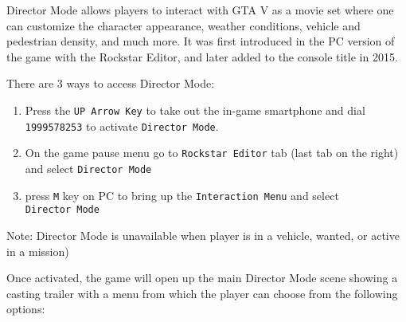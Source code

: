 \documentclass[
  openany]{book}
\providecommand{\tightlist}{%
  \setlength{\itemsep}{0pt}\setlength{\parskip}{0pt}}
\begin{document}
Director Mode allows players to interact with GTA V as a movie set where one can customize the character appearance, weather conditions, vehicle and pedestrian density, and much more.
It was first introduced in the PC version of the game with the Rockstar Editor, and later added to the console title in 2015.

There are 3 ways to access Director Mode:

\begin{enumerate}
\def\labelenumi{\arabic{enumi}.}
\tightlist
\item
  Press the \texttt{UP\ Arrow\ Key} to take out the in-game smartphone and dial \texttt{1999578253} to activate \texttt{Director\ Mode}.
\item
  On the game pause menu go to \texttt{Rockstar\ Editor} tab (last tab on the right) and select \texttt{Director\ Mode}
\item
  press \texttt{M} key on PC to bring up the \texttt{Interaction\ Menu} and select \texttt{Director\ Mode}
\end{enumerate}

Note: Director Mode is unavailable when player is in a vehicle, wanted, or active in a mission)

Once activated, the game will open up the main Director Mode scene showing a casting trailer with a menu from which the player can choose from the following options:
\end{document}
